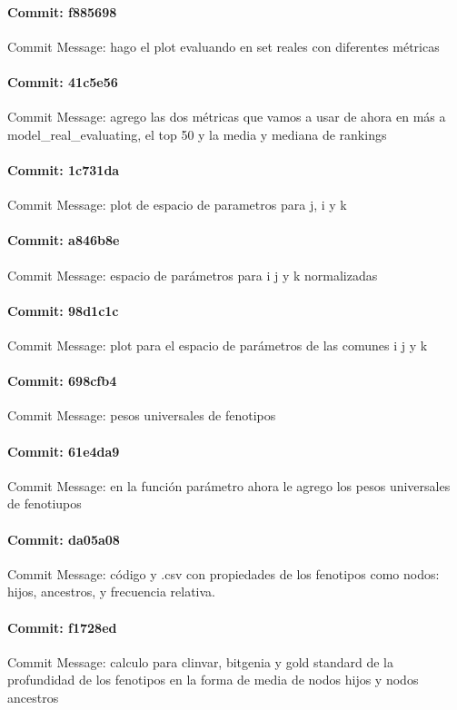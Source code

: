 \documentclass{article}
\begin{document}
\paragraph{Commit: f885698}
Commit Message: hago el plot evaluando en set reales con diferentes métricas

\paragraph{Commit: 41c5e56}
Commit Message: agrego las dos métricas que vamos a usar de ahora en más a model_real_evaluating, el top 50 y la media y mediana de rankings

\paragraph{Commit: 1c731da}
Commit Message: plot de espacio de parametros para j, i y k

\paragraph{Commit: a846b8e}
Commit Message: espacio de parámetros para i j y k normalizadas

\paragraph{Commit: 98d1c1c}
Commit Message: plot para el espacio de parámetros de las comunes i j y k

\paragraph{Commit: 698cfb4}
Commit Message: pesos universales de fenotipos

\paragraph{Commit: 61e4da9}
Commit Message: en la función parámetro ahora le agrego los pesos universales de fenotiupos

\paragraph{Commit: da05a08}
Commit Message: código y .csv con propiedades de los fenotipos como nodos: hijos, ancestros, y frecuencia relativa.

\paragraph{Commit: f1728ed}
Commit Message: calculo para clinvar, bitgenia y gold standard de la profundidad de los fenotipos en la forma de media de nodos hijos y nodos ancestros
\end{document}
